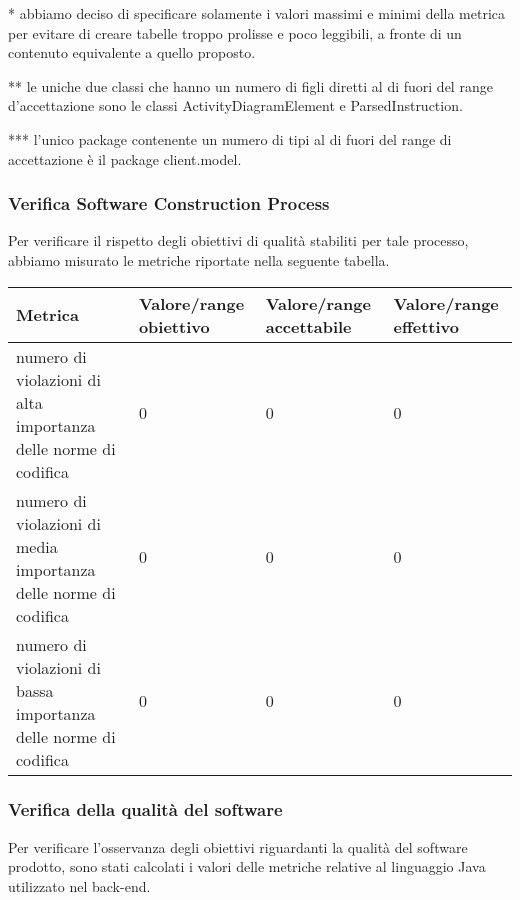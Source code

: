 	* abbiamo deciso di specificare solamente i valori massimi e minimi della metrica per evitare di creare tabelle troppo prolisse e poco leggibili, a fronte di un contenuto equivalente a quello proposto.
	
	** le uniche due classi che hanno un numero di figli diretti al di fuori del range d'accettazione sono le classi ActivityDiagramElement e ParsedInstruction.
	
	*** l'unico package contenente un numero di tipi al di fuori del range di accettazione è il package client.model.
	
	\subsubsection{Verifica Software Construction Process}	
	Per verificare il rispetto degli obiettivi di qualità stabiliti per tale processo, abbiamo misurato le metriche riportate nella seguente tabella.
	
\begin{center}
\begin{tabular}{| p{6cm} | p{2.5cm} | p{2.5cm} | p{2.5cm} |}
	\hline
	\textbf{Metrica} & \textbf{Valore/range obiettivo} & \textbf{Valore/range accettabile} & \textbf{Valore/range effettivo} \\
	\hline
	numero di violazioni di alta importanza delle norme di codifica & $0$ & $0$ & $0$\\
	numero di violazioni di media importanza delle norme di codifica & $0$ & $0$ & $0$\\
	numero di violazioni di bassa importanza delle norme di codifica & $0$ & $0$ & $0$\\
	\hline
\end{tabular}
\end{center}
		
	
		\subsubsection{Verifica della qualità del software}
		Per verificare l'osservanza degli obiettivi riguardanti la qualità del software prodotto, sono stati calcolati i valori delle metriche relative al linguaggio Java utilizzato nel back-end.
		
